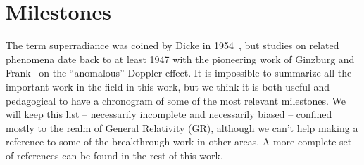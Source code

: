 \documentclass[11pt]{article}
\numberwithin{equation}{section} %
\begin{document}
\section{Milestones}
The term superradiance was coined by Dicke in 1954~\cite{Dicke:1954zz}, but studies on related phenomena date back to at least 1947 with the pioneering work of Ginzburg and Frank~\cite{Ginzburg:1947} on the ``anomalous'' Doppler effect. It is impossible to summarize all the important work
in the field in this work, but we think it is both useful and pedagogical to have a chronogram
of some of the most relevant milestones. We will keep this list -- necessarily incomplete and necessarily biased --
confined mostly to the realm of General Relativity (GR), although we can't help 
making a reference to some of the breakthrough work in other areas.
A more complete set of references can be found in the rest of this work.
\end{document}
